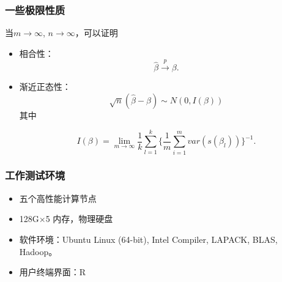 \documentclass[10pt]{beamer}
\begin{document}
\begin{frame}
  \frametitle{一些极限性质}

当$m \to \infty$, $n \to \infty$，可以证明
  \begin{itemize}
  \item 相合性：
    \begin{equation*}
      {\widehat \beta} \xrightarrow{p} \beta.
    \end{equation*}

  \item 渐近正态性：
    \begin{equation*}
      \sqrt{n} (\widehat \beta -\beta) \sim N(0, I(\beta))
    \end{equation*}
    其中

    \begin{equation*}
      I(\beta) = \lim \limits_{m \to \infty} \frac{1}{k}\sum_{l=1}^k
      \{\frac{1}{m}\sum_{i=1}^m var (s(\beta_l))\}^{-1}.
\end{equation*}



  \end{itemize}
\end{frame}




\begin{frame}
  \frametitle{工作测试环境}

  \begin{itemize}

  \item 五个高性能计算节点

  \item 128G$\times$5 内存，物理硬盘

  \item 软件环境：Ubuntu Linux (64-bit),  Intel Compiler,
    LAPACK, BLAS, Hadoop。

  \item 用户终端界面：R

  \end{itemize}

\end{frame}
\end{document}
